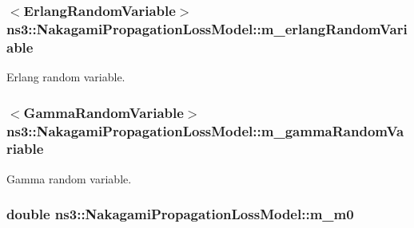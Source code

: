 \subsubsection[{\texorpdfstring{m\+\_\+erlang\+Random\+Variable}{m_erlangRandomVariable}}]{$<${\bf Erlang\+Random\+Variable}$>$ ns3\+::\+Nakagami\+Propagation\+Loss\+Model\+::m\+\_\+erlang\+Random\+Variable\hspace{0.3cm}{\ttfamily [private]}}\hypertarget{classns3_1_1NakagamiPropagationLossModel_a0aac232ec149639051fd334436ea03b4}{}\label{classns3_1_1NakagamiPropagationLossModel_a0aac232ec149639051fd334436ea03b4}


Erlang random variable. 

\subsubsection[{\texorpdfstring{m\+\_\+gamma\+Random\+Variable}{m_gammaRandomVariable}}]{$<${\bf Gamma\+Random\+Variable}$>$ ns3\+::\+Nakagami\+Propagation\+Loss\+Model\+::m\+\_\+gamma\+Random\+Variable\hspace{0.3cm}{\ttfamily [private]}}\hypertarget{classns3_1_1NakagamiPropagationLossModel_a2674c7bd999e9c22176a606a1acc7ae1}{}\label{classns3_1_1NakagamiPropagationLossModel_a2674c7bd999e9c22176a606a1acc7ae1}


Gamma random variable. 

\subsubsection[{\texorpdfstring{m\+\_\+m0}{m_m0}}]{\setlength{\rightskip}{0pt plus 5cm}double ns3\+::\+Nakagami\+Propagation\+Loss\+Model\+::m\+\_\+m0\hspace{0.3cm}{\ttfamily [private]}}\hypertarget{classns3_1_1NakagamiPropagationLossModel_a188d8e524f49ac1dfcb56b7788807e6c}{}\label{classns3_1_1NakagamiPropagationLossModel_a188d8e524f49ac1dfcb56b7788807e6c}


